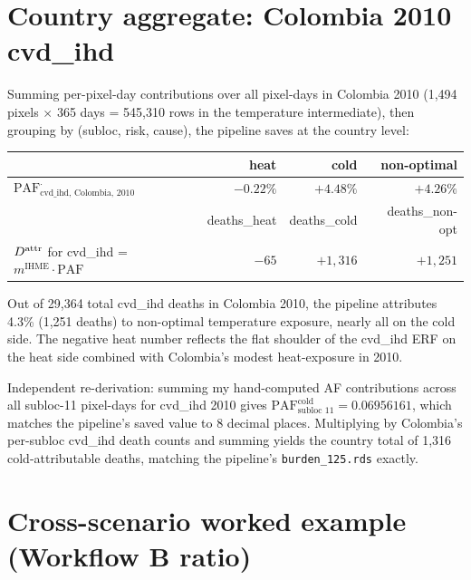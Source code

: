 \documentclass[11pt]{article}
\newcommand{\PAF}{\text{PAF}}
\newcommand{\mIHME}{m^{\text{IHME}}}
\begin{document}
\section{Country aggregate: Colombia 2010 cvd\_ihd}
\label{sec:country-agg}

Summing per-pixel-day contributions over all pixel-days in Colombia 2010
(1{,}494 pixels $\times$ 365 days = 545{,}310 rows in the temperature
intermediate), then grouping by (subloc, risk, cause), the pipeline
saves at the country level:

\begin{center}
\renewcommand{\arraystretch}{1.1}
\begin{tabular}{l r r r}
\toprule
& heat & cold & non-optimal \\
\midrule
$\PAF^{\cdot}_{\text{cvd\_ihd, Colombia, 2010}}$ & $-0.22\%$ & $+4.48\%$ & $+4.26\%$ \\
\midrule
& deaths\_heat & deaths\_cold & deaths\_non-opt \\
$\mAttr$ for cvd\_ihd = $\mIHME \cdot \PAF$ & $-65$ & $+1{,}316$ & $+1{,}251$ \\
\bottomrule
\end{tabular}
\end{center}

Out of 29{,}364 total cvd\_ihd deaths in Colombia 2010, the pipeline
attributes 4.3\% (1{,}251 deaths) to non-optimal temperature exposure,
nearly all on the cold side. The negative heat number reflects the flat
shoulder of the cvd\_ihd ERF on the heat side combined with Colombia's
modest heat-exposure in 2010.

Independent re-derivation: summing my hand-computed AF contributions
across all subloc-11 pixel-days for cvd\_ihd 2010 gives
$\PAF^{\text{cold}}_{\text{subloc 11}} = 0.06956161$, which matches the
pipeline's saved value to 8 decimal places. Multiplying by Colombia's
per-subloc cvd\_ihd death counts and summing yields the country total of
1{,}316 cold-attributable deaths, matching the pipeline's
\texttt{burden\_125.rds} exactly.

\section{Cross-scenario worked example (Workflow B ratio)}
\label{sec:wb-example}
\end{document}
